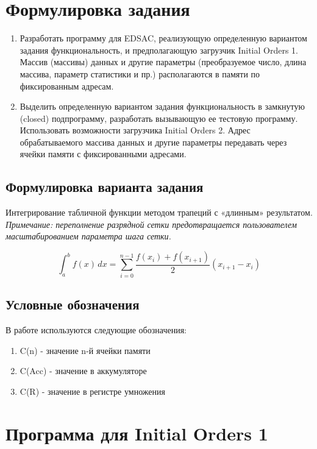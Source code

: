 






\section{Формулировка задания}
\begin{enumerate}
\item Разработать программу для EDSAC, реализующую определенную вариантом задания функциональность, и предполагающую загрузчик Initial Orders 1. Массив (массивы) данных и другие параметры (преобразуемое число, длина массива, параметр статистики и пр.) располагаются в памяти по фиксированным адресам.
\item Выделить определенную вариантом задания функциональность в замкнутую (closed) подпрограмму, разработать вызывающую ее тестовую программу. Использовать возможности загрузчика Initial Orders 2. Адрес обрабатываемого массива данных и другие параметры передавать через ячейки памяти с фиксированными адресами.
\end{enumerate}

\subsection{ Формулировка варианта задания}
Интегрирование табличной функции методом трапеций с «длинным» результатом.
\textit{Примечание: переполнение разрядной сетки предотвращается пользователем масштабированием параметра шага сетки.}

\[ \int_{a}^{b} f(x) \,dx = \sum_{i=0}^{n-1} \frac{f(x_i) + f(x_{i+1})}{2}(x_{i+1}-x_i) \]

\subsection{ Условные обозначения}
В работе используются следующие обозначения:
\begin{enumerate}
\item C(n) - значение n-й ячейки памяти
\item C(Acc) - значение в аккумуляторе
\item C(R) - значение в регистре умножения
\end{enumerate}

\section{Программа для Initial Orders 1}
